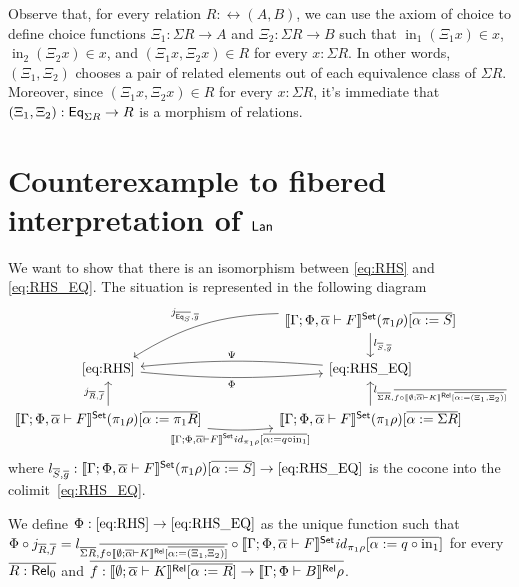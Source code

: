 \documentclass{lmcs}
\theoremstyle{plain}\newtheorem{satz}[thm]{Satz}
\renewcommand{\id}{\mathit{id}}
\DeclareMathOperator{\SumIn}{in}
\begin{document}
Observe that, for every relation $R : \rel(A, B)$, we can use the axiom of choice to define choice functions $\Xi_1 : \Sigma R \to A$ and $\Xi_2 : \Sigma R \to B$ such that $\SumIn_1 ( \Xi_1 x ) \in x$, $\SumIn_2 (\Xi_2 x ) \in x$, and $(\Xi_1 x, \Xi_2 x) \in R$ for every $x : \Sigma R$.
In other words, $(\Xi_1, \Xi_2)$ chooses a pair of related elements out of each equivalence class of $\Sigma R$.
Moreover, since $(\Xi_1 x, \Xi_2 x) \in R$ for every $x : \Sigma R$, it's immediate that $(\Xi_1, \Xi_2) : \mathsf{Eq}_{\Sigma R} \to R$ is a morphism of relations.




\section{Counterexample to fibered interpretation of $\mathsf{Lan}$}

We want to show that there is an isomorphism between \eqref{eq:RHS} and \eqref{eq:RHS_EQ}.
The situation is represented in the following diagram
\[
\begin{tikzcd}[column sep = huge]
&\setsem{\Gamma; \Phi, \ol\alpha \vdash F} (\pi_1 \rho) [\ol{\alpha := S}]
\ar[d, "{l_{\ol{S}, \ol{g}}}"]
\ar[dl, bend right = 15, "{j_{\ol{\Eq_{S}}, \ol{g}}}"'] \\
\eqref{eq:RHS}
\ar[r, bend right = 5, "{\Phi}"']
&\eqref{eq:RHS_EQ}
\ar[l, bend right = 5, "{\Psi}"'] \\
\setsem{\Gamma; \Phi, \ol\alpha \vdash F} (\pi_1 \rho) [\ol{\alpha := \pi_1 R}]
\ar[r, bend right = 5, "{\setsem{\Gamma; \Phi, \ol\alpha \vdash F} \id_{\pi_1 \rho} [\ol{\alpha := q \circ \SumIn_1}]}"']
\ar[u, "{j_{\ol{R}, \ol{f}}}"]
&\setsem{\Gamma; \Phi, \ol\alpha \vdash F} (\pi_1 \rho) [\ol{\alpha := \Sigma{R}}]
\ar[u, "{l_{\ol{\Sigma{R}}, \ol{f \circ \relsem{\emptyset; \ol\alpha \vdash K}[\ol{\alpha := (\Xi_1, \Xi_2)}]}}}"']
\end{tikzcd}
\]
where $l_{\overline{S}, \overline{g}} : \llbracket{\Gamma; \Phi, \overline{\alpha} \vdash F}\rrbracket^{\mathsf{Set}} (\pi_1 \rho) [\overline{\alpha := S}] \to \eqref{eq:RHS_EQ}$ is the cocone into the colimit~\eqref{eq:RHS_EQ}.

We define $\Phi : \eqref{eq:RHS} \to \eqref{eq:RHS_EQ}$ as the unique function such that $\Phi \circ j_{\ol{R}, \ol{f}} = l_{\ol{\Sigma{R}}, \ol{f \circ \relsem{\emptyset; \ol\alpha \vdash K}[\ol{\alpha := (\Xi_1, \Xi_2)}]}} \circ \setsem{\Gamma; \Phi, \ol\alpha \vdash F} \id_{\pi_1 \rho}[\ol{\alpha := q \circ \SumIn_1}]$ for every $\overline{R : \mathsf{Rel}_0}$ and $\overline{f : \llbracket{\emptyset; \overline{\alpha} \vdash K}\rrbracket^{\mathsf{Rel}}[\overline{\alpha := R}] \to \llbracket{\Gamma; \Phi \vdash B}\rrbracket^{\mathsf{Rel}}\rho}$.
\end{document}
